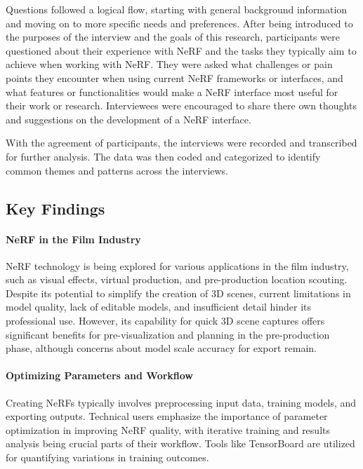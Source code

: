 Questions followed a logical flow, starting with general background information and moving on to more specific needs and preferences. 
After being introduced to the purposes of the interview and the goals of this research, participants were questioned about their experience with NeRF and the tasks they typically aim to achieve when working with NeRF. 
They were asked what challenges or pain points they encounter when using current NeRF frameworks or interfaces, and what features or functionalities would make a NeRF interface most useful for their work or research.
Interviewees were encouraged to share there own thoughts and suggestions on the development of a NeRF interface.

With the agreement of participants, the interviews were recorded and transcribed for further analysis. 
The data was then coded and categorized to identify common themes and patterns across the interviews.

\subsection{Key Findings}
\label{sec:methodology:user-research:findings}

\paragraph{NeRF in the Film Industry}

NeRF technology is being explored for various applications in the film industry, such as visual effects, virtual production, and pre-production location scouting. 
Despite its potential to simplify the creation of 3D scenes, current limitations in model quality, lack of editable models, and insufficient detail hinder its professional use. 
However, its capability for quick 3D scene captures offers significant benefits for pre-visualization and planning in the pre-production phase, although concerns about model scale accuracy for export remain.

\paragraph{Optimizing Parameters and Workflow}

Creating NeRFs typically involves preprocessing input data, training models, and exporting outputs. 
Technical users emphasize the importance of parameter optimization in improving NeRF quality, with iterative training and results analysis being crucial parts of their workflow. 
Tools like TensorBoard are utilized for quantifying variations in training outcomes.

